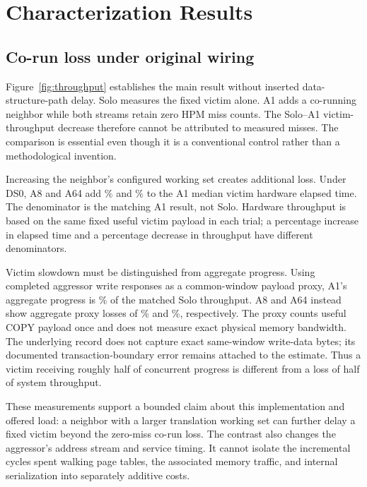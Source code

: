 \section{Characterization Results}
\subsection{Co-run loss under original wiring}
Figure~\ref{fig:throughput} establishes the main result without inserted data-structure-path delay. Solo measures the fixed victim alone. A1 adds a co-running neighbor while both streams retain zero HPM miss counts. The Solo--A1 victim-throughput decrease therefore cannot be attributed to measured misses. The comparison is essential even though it is a conventional control rather than a methodological invention.

Increasing the neighbor's configured working set creates additional loss. Under DS0, A8 and A64 add \DSZeroAEightElapsedExtra\% and \DSZeroASixtyFourElapsedExtra\% to the A1 median victim hardware elapsed time. The denominator is the matching A1 result, not Solo. Hardware throughput is based on the same fixed useful victim payload in each trial; a percentage increase in elapsed time and a percentage decrease in throughput have different denominators.

Victim slowdown must be distinguished from aggregate progress. Using completed aggressor write responses as a common-window payload proxy, A1's aggregate progress is \DSZeroAOneAggregatePercent\% of the matched Solo throughput. A8 and A64 instead show aggregate proxy losses of \DSZeroAEightAggregateLoss\% and \DSZeroASixtyFourAggregateLoss\%, respectively. The proxy counts useful COPY payload once and does not measure exact physical memory bandwidth. The underlying record does not capture exact same-window write-data bytes; its documented transaction-boundary error remains attached to the estimate. Thus a victim receiving roughly half of concurrent progress is different from a loss of half of system throughput.

These measurements support a bounded claim about this implementation and offered load: a neighbor with a larger translation working set can further delay a fixed victim beyond the zero-miss co-run loss. The contrast also changes the aggressor's address stream and service timing. It cannot isolate the incremental cycles spent walking page tables, the associated memory traffic, and internal serialization into separately additive costs.

